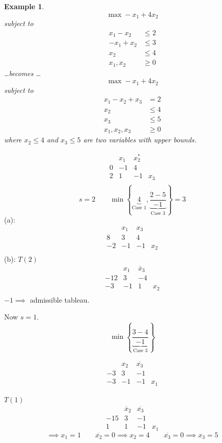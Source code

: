\documentclass[a4paper]{article}
\numberwithin{lecref}{subsection}
\newcounter{exercises}
\newtheorem{example}[exercises]{Example}
\newcommand{\Set}[1]{\left\{#1\right\}}
\begin{document}
\begin{description}
		\begin{example}
			\[ \max -x_1 + 4x_2 \]
			subject to
			\begin{align*}
				x_1 - x_2 &\leq 2 \\
				-x_1 + x_2 &\leq 3 \\
				x_2 &\leq 4 \\
				x_1, x_2 &\geq 0
			\end{align*}
			\dots becomes \dots
			\[ \max -x_1 + 4x_2 \]
			subject to
			\begin{align*}
				x_1 - x_2 + x_3 &= 2 \\
				x_2 &\leq 4 \\
				x_3 &\leq 5 \\
				x_1, x_2, x_3 &\geq 0
			\end{align*}
			where $x_2 \leq 4$ and $x_3 \leq 5$ are two variables with upper bounds.
		\end{example}

		\begin{center}
			\[\begin{array}{c|ccc}
				  & x_1 & x_2^* & \\
				0 & -1 & 4 & \\
			\hline
				2 & 1 & -1 & x_3 \\
			\end{array}\]
			\[ s = 2 \qquad \min\Set{\underbrace{4}_{\text{Case 1}}, \underbrace{\frac{2 - 5}{-1}}_{\text{Case 3}}} = 3 \]
			(a):
			\[\begin{array}{c|ccc}
				  & x_1 & x_3 \\
				8 & 3 & 4 & \\
			\hline
				-2 & -1 & -1 & x_2 \\
			\end{array}\]
			(b): $T(2)$
			\[\begin{array}{c|ccc}
				  & x_1 & \overline x_3 \\
				-12 & 3 & -4 & \\
			\hline
				-3 & -1 & 1 & x_2 \\
			\end{array}\]
			$-1 \implies$ admissible tableau.

			Now $s = 1$.
			\[ \min\Set{\underbrace{\frac{3-4}{-1}}_{\text{Case 3}}} \]

			\[\begin{array}{c|ccc}
				   & x_2 & \overline{x_3} & \\
				-3 & 3 & -1 & \\
			\hline
				-3 & -1 & -1 & x_1
			\end{array}\]

			$T(1)$
			\[\begin{array}{c|ccc}
				    & \overline x_2 & \overline{x_3} & \\
				-15 & 3 & -1 & \\
			\hline
				1 & 1 & -1 & x_1
			\end{array}\]
			\[ \implies x_1 = 1 \qquad \overline{x_2} = 0 \implies x_2 = 4 \qquad \overline{x_3} = 0 \implies x_3 = 5 \]
		\end{center}
\end{description}
\end{document}
